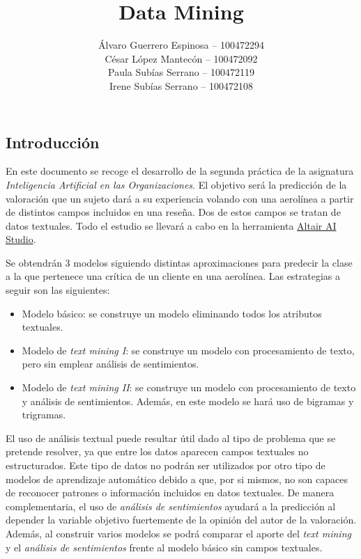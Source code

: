 \documentclass[es]{uc3mreport}
\author{
    Álvaro Guerrero Espinosa -- 100472294 \\
    César López Mantecón -- 100472092 \\
    Paula Subías Serrano -- 100472119 \\
    Irene Subías Serrano -- 100472108
}
\title{Data Mining}
\begin{document}
  \makecover[new]

  \tableofcontents
  \listoffigures
  \listoftables

  \begin{report}

\section{Introducción}
\label{chap:intro}
En este documento se recoge el desarrollo de la segunda práctica de la asignatura \textit{Inteligencia Artificial en las Organizaciones}. El objetivo será la predicción de la valoración que un sujeto dará a su experiencia volando con una aerolínea a partir de distintos campos incluidos en una reseña. Dos de estos campos se tratan de datos textuales. Todo el estudio se llevará a cabo en la herramienta \href{https://altair.com/altair-ai-studio}{Altair AI Studio}.

Se obtendrán 3 modelos siguiendo distintas aproximaciones para predecir la clase a la que pertenece una crítica de un cliente en una aerolínea. Las estrategias a seguir son las siguientes:

\begin{itemize}
    \item Modelo básico: se construye un modelo eliminando todos los atributos textuales.
    \item Modelo de \textit{text mining I}: se construye un modelo con procesamiento de texto, pero sin emplear análisis de sentimientos.
    \item Modelo de \textit{text mining II}: se construye un modelo con procesamiento de texto y análisis de sentimientos. Además, en este modelo se hará uso de bigramas y trigramas.
\end{itemize}

El uso de análisis textual puede resultar útil dado al tipo de problema que se
pretende resolver, ya que entre los datos aparecen campos textuales no
estructurados. Este tipo de datos no podrán ser utilizados por otro tipo de
modelos de aprendizaje automático debido a que, por si mismos, no son capaces de
reconocer patrones o información incluidos en datos textuales. De manera complementaria,
el uso de \textit{análisis de sentimientos} ayudará a la predicción al depender la variable
objetivo fuertemente de la opinión del autor de la valoración. Además, 
al construir varios modelos se podrá comparar el aporte del \textit{text mining}
y el \textit{análisis de sentimientos} frente al modelo básico sin campos textuales.


\end{report}
\end{document}
